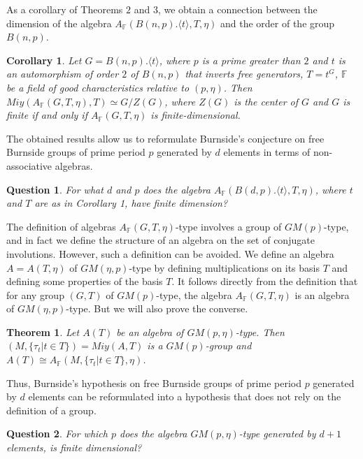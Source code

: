 \documentclass[12pt]{article}
\newcommand\F{\mathbb{F}}
\newcommand\la{\langle}
\newcommand\ra{\rangle}
\newtheorem{Th}{Theorem}
\newtheorem{question}{Question}
\newtheorem{cor}{Corollary}
\begin{document}
As a corollary of Theorems $2$ and $3$, we obtain a connection between the dimension of the algebra $A_{\F}(B(n,p).\la t\ra,T,\eta)$ and the order of the group $B(n,p)$.

\begin{cor}
Let $G= B(n,p).\la t\ra$, where $p$ is a prime greater than $2$ and $t$ is an automorphism of order $2$ of $B(n,p)$ that inverts free generators, $T=t^G$, $\F$ be a field of good characteristics relative to $(p,\eta)$. Then $Miy(A_{\F}(G,T,\eta),T)\simeq G/Z(G)$, where $Z(G)$ is the center of $G$ and $G$ is finite if and only if $A_ {\F}(G,T,\eta)$ is finite-dimensional.
\end{cor}

The obtained results allow us to reformulate Burnside's  conjecture on free Burnside groups of prime period $p$ generated by $d$ elements in terms of non-associative algebras.

\begin{question}
	For what $d$ and $p$ does the algebra $A_{\F}(B(d,p).\la t\ra, T, \eta)$, where $t$ and $T$ are as in Corollary 1, have finite dimension?
\end{question}

The definition of algebras $A_{\F}(G,T,\eta)$-type involves a group of $GM(p)$-type, and in fact we define the structure of an algebra on the set of conjugate involutions. However, such a definition can be avoided. We define an algebra $A=A(T,\eta)$ of $GM(\eta, p)$-type by defining multiplications on its basis $T$ and defining some properties of the basis $T$. It follows directly from the definition that for any group $(G,T)$ of $GM(p)$-type, the algebra $A_{\F}(G,T,\eta)$ is an algebra of $GM(\eta, p)$-type. But we will also prove the converse.

\begin{Th}
Let $A(T)$ be an algebra of $GM(p,\eta)$-type. Then $(M,\{\tau_t|t\in T\})=Miy(A,T)$ is a $GM(p)$-group and $A(T)\cong A_{\F}(M,\{\tau_t|t\in T\},\eta)$.
\end{Th}

Thus, Burnside's hypothesis on free Burnside groups of prime period $p$ generated by $d$ elements can be reformulated into a hypothesis that does not rely on the definition of a group.

\begin{question}
	For which $p$ does the algebra $GM(p,\eta)$-type generated by $d+1$ elements, is finite dimensional?
\end{question}
\end{document}

